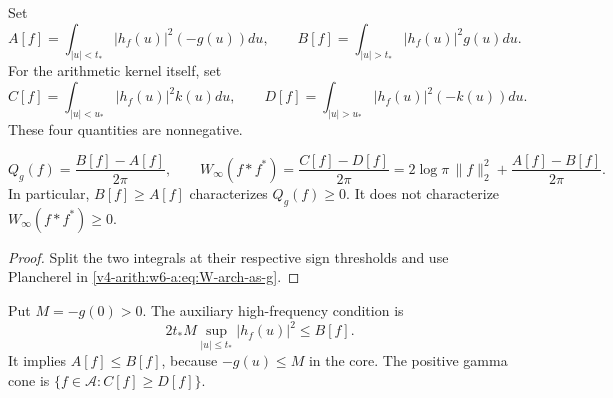 \begin{definition}
\label{v4-arith:w6-a:def:core-tail}
Set
\[
 A[f]=\int_{|u|<t_*}|h_f(u)|^2(-g(u))du,\qquad
 B[f]=\int_{|u|>t_*}|h_f(u)|^2g(u)du.
\]
For the arithmetic kernel itself, set
\[
 C[f]=\int_{|u|<u_*}|h_f(u)|^2k(u)du,\qquad
 D[f]=\int_{|u|>u_*}|h_f(u)|^2(-k(u))du.
\]
These four quantities are nonnegative.
\end{definition}

\begin{proposition}
\label{v4-arith:w6-a:lem:decomposition}
\[
 Q_g(f)=\frac{B[f]-A[f]}{2\pi},\qquad
 W_\infty(f*f^*)=\frac{C[f]-D[f]}{2\pi}
 =2\log\pi\,\|f\|_2^2+\frac{A[f]-B[f]}{2\pi}.
\]
In particular, $B[f]\ge A[f]$ characterizes $Q_g(f)\ge0$.
It does not characterize $W_\infty(f*f^*)\ge0$.
\end{proposition}
\begin{proof}
Split the two integrals at their respective sign thresholds and
use Plancherel in \eqref{v4-arith:w6-a:eq:W-arch-as-g}.
\end{proof}

\begin{definition}
\label{v4-arith:w6-a:def:HFD-class}
Put $M=-g(0)>0$. The auxiliary high-frequency condition is
\begin{equation}
 2t_*M\sup_{|u|\le t_*}|h_f(u)|^2\le B[f].
 \label{v4-arith:w6-a:eq:HFD-condition}
\end{equation}
It implies $A[f]\le B[f]$, because $-g(u)\le M$ in the core.
The positive gamma cone is $\{f\in\mathscr A:C[f]\ge D[f]\}$.
\end{definition}

